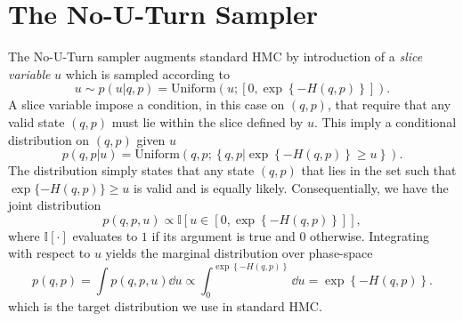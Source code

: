 \section{The No-U-Turn Sampler}
The No-U-Turn sampler augments standard HMC by introduction of a \textit{slice variable} $u$ which is sampled according to
\begin{equation}
    u \sim p(u|q, p) = \text{Uniform}\left(u; \left[0, \exp\left\{-H(q, p)\right\}\right]\right).
\end{equation} 
A slice variable impose a condition, in this case on $(q, p)$, that require that any valid state $(q, p)$ must lie within the slice defined by $u$. This imply a conditional distribution on $(q, p)$ given $u$
\begin{equation}
    p(q, p|u) = \text{Uniform}\left( q, p; \left\{q, p \bigg| \exp\left\{-H(q, p)\right\} \geq u \right\} \right).
\end{equation}
The distribution simply states that any state $(q, p)$ that lies in the set such that $\exp\{-H(q, p)\} \geq u$ is valid and is equally likely.
Consequentially, we have the joint distribution 
\begin{equation}
    p(q, p, u) \propto \mathbb{I}\left[u \in \left[0, \exp\left\{-H(q, p)\right\}\right]\right],
\end{equation}
where $\mathbb{I}[\cdot]$ evaluates to $1$ if its argument is true and $0$ otherwise. 
Integrating with respect to $u$ yields the marginal distribution
over phase-space
\begin{equation}
    p(q, p) = \int p(q, p, u) \dd u \propto \int_0^{\exp\left\{-H(q, p)\right\}}\dd u = \exp\left\{-H(q, p)\right\}.
\end{equation}
which is the target distribution we use in standard HMC.

